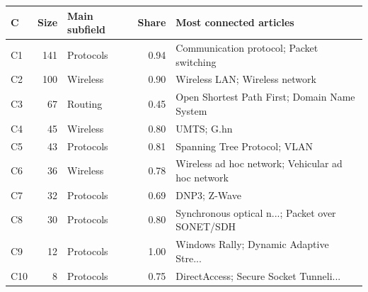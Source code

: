
\begin{tabular}{lrlrl}
\toprule
C & Size & Main subfield & Share & Most connected articles\\
\midrule
C1 & 141 & Protocols & 0.94 & Communication protocol; Packet switching\\
C2 & 100 & Wireless & 0.90 & Wireless LAN; Wireless network\\
C3 & 67 & Routing & 0.45 & Open Shortest Path First; Domain Name System\\
C4 & 45 & Wireless & 0.80 & UMTS; G.hn\\
C5 & 43 & Protocols & 0.81 & Spanning Tree Protocol; VLAN\\
C6 & 36 & Wireless & 0.78 & Wireless ad hoc network; Vehicular ad hoc network\\
C7 & 32 & Protocols & 0.69 & DNP3; Z-Wave\\
C8 & 30 & Protocols & 0.80 & Synchronous optical n...; Packet over SONET/SDH\\
C9 & 12 & Protocols & 1.00 & Windows Rally; Dynamic Adaptive Stre...\\
C10 & 8 & Protocols & 0.75 & DirectAccess; Secure Socket Tunneli...\\
\bottomrule
\end{tabular}
